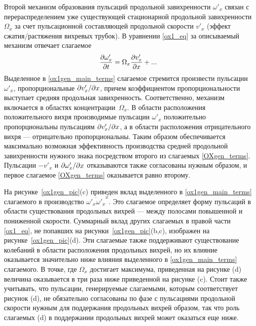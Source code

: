 Второй механизм образования пульсаций продольной завихренности $\omega'_x$ связан с перераспределением уже существующей стационарной продольной завихренности $\Omega_x$ за счет пульсационной составляющей продольной скорости $v'_x$ (эффект сжатия/растяжения вихревых трубок). В уравнении \eqref{ox1_eq} за описываемый механизм отвечает слагаемое
\begin{equation}\label{ox1gen_main_terms}
\frac{\partial \omega'_x}{\partial t} = \Omega_x \frac {\partial v'_x}{\partial x} + ...
\end{equation}
Выделенное в \eqref{ox1gen_main_terms} слагаемое стремится произвести пульсации $\omega'_x$, пропорциональные $\partial v'_x / \partial x$, причем коэффициентом пропорциональности выступает средняя продольная завихренность. Соответственно,  механизм включается в областях концентрации~$\Omega_x$. В области расположения положительного вихря производимые пульсации $\omega'_x$ положительно пропорциональны пульсациям $\partial v'_x / \partial x$, а в области расположения отрицательного вихря --- отрицательно пропорциональны. Таким образом обеспечивается максимально возможная эффективность производства средней продольной завихренности нужного знака посредством второго из слагаемых \eqref{OXgen_terms}. Пульсации $-v'_x$ и $\partial \omega'_x / \partial x$ отказываются также согласованы нужным образом, и первое слагаемое \eqref{OXgen_terms} оказывается равно второму.

На рисунке~\ref{ox1gen_pic}(c) приведен вклад выделенного в \eqref{ox1gen_main_terms} слагаемого в производство $\overline{\omega'_x \omega'_x}^x$. Это слагаемое определяет форму пульсаций в области существования продольных вихрей --- между полосами повышенной и пониженной скорости. Суммарный вклад других слагаемых в правой части \eqref{ox1_eq}, не попавших на рисунки~\ref{ox1gen_pic}(b,c), изображен на рисунке~\ref{ox1gen_pic}(d). Эти слагаемые также поддерживают существование колебаний в области расположения продольных вихрей, но их влияние оказывается значительно ниже влияния выделенного в \eqref{ox1gen_main_terms} слагаемого. В точке, где $\Omega_x$ достигает максимума, приведенная на рисунке (d) величина оказывается в три раза ниже приведенной на рисунке (c). Стоит также учитывать, что пульсации, генерируемые слагаемыми, которым соответствует рисунок (d), не обязательно согласованы по фазе с пульсациями продольной скорости нужным для поддержания продольных вихрей образом, так что роль слагаемых (d) в поддержании продольных вихрей может оказаться еще ниже. 


